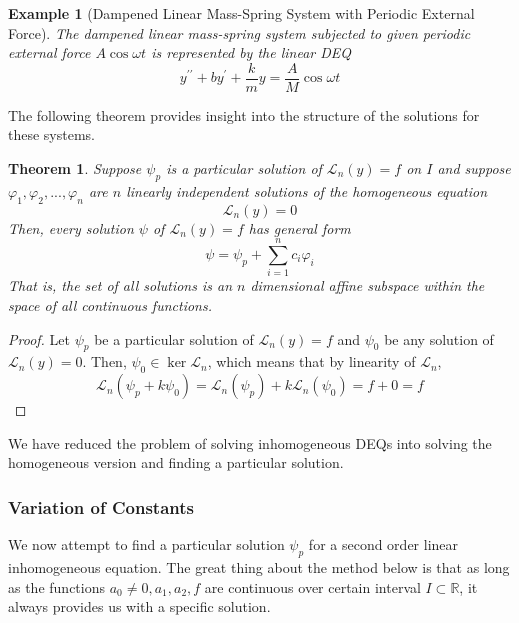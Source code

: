 \documentclass{article}
\newtheorem{theorem}{Theorem}[section]
\newtheorem{example}{Example}[section]
\theoremstyle{remark}
\theoremstyle{definition}
\begin{document}
\begin{example}[Dampened Linear Mass-Spring System with Periodic External Force]
The dampened linear mass-spring system subjected to given periodic external force $A \cos{\omega t}$ is represented by the linear DEQ
\[y^{\prime \prime} + by^\prime + \frac{k}{m} y = \frac{A}{M} \cos{\omega t}\]
\end{example}

The following theorem provides insight into the structure of the solutions for these systems. 
\begin{theorem}
Suppose $\psi_p$ is a particular solution of $\mathcal{L}_n (y) = f$ on $I$ and suppose $\varphi_1, \varphi_2, ..., \varphi_n$ are $n$ linearly independent solutions of the homogeneous equation 
\[\mathcal{L}_n (y) = 0\]
Then, every solution $\psi$ of $\mathcal{L}_n (y) = f$ has general form
\[\psi = \psi_p + \sum_{i=1}^n c_i \varphi_i\]
That is, the set of all solutions is an $n$ dimensional affine subspace within the space of all continuous functions. 
\end{theorem}
\begin{proof}
Let $\psi_p$ be a particular solution of $\mathcal{L}_n (y) = f$ and $\psi_0$ be any solution of $\mathcal{L}_n (y) = 0$. Then, $\psi_0 \in \ker{\mathcal{L}_n}$, which means that by linearity of $\mathcal{L}_n$, 
\[\mathcal{L}_n (\psi_p + k \psi_0) = \mathcal{L}_n (\psi_p) + k \mathcal{L}_n (\psi_0) = f + 0 = f\]
\end{proof}

We have reduced the problem of solving inhomogeneous DEQs into solving the homogeneous version and finding a particular solution. 

\subsubsection{Variation of Constants}
We now attempt to find a particular solution $\psi_p$ for a second order linear inhomogeneous equation. The great thing about the method below is that as long as the functions $a_0 \neq 0, a_1, a_2, f$ are continuous over certain interval $I \subset \mathbb{R}$, it always provides us with a specific solution. 
\end{document}
